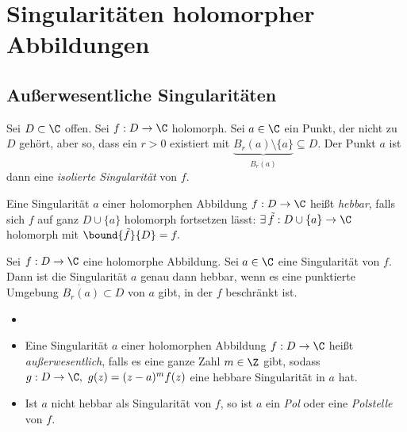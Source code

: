 \chapter[Singularitäten]{Singularitäten holomorpher Abbildungen}\lecture
	
	\section{Außerwesentliche Singularitäten}
		
		\begin{defn}
			Sei $ D \subset \C $ offen. Sei $ f: D \to \C $ holomorph. Sei $ a \in \C $ ein Punkt, der nicht zu $D$ gehört, aber so, dass ein $r>0$ existiert mit $ \underbrace{B_r(a) \setminus \{a\}}_{\dot{B_r(a)}} \subseteq D $. Der Punkt $a$ ist dann eine \emph{isolierte Singularität} von $f$.
		\end{defn}
		
		\begin{defn}
			Eine Singularität $a$ einer holomorphen Abbildung $f: D \to \C$ heißt \emph{hebbar}, falls sich $f$ auf ganz $D \cup \{a\}$ holomorph fortsetzen lässt: $ \exists\, \tilde{f}: D \cup \{a\} \to \C $ holomorph mit $ \bound{\tilde{f}}{D} = f. $
		\end{defn}
		
		\begin{thmn}
			Sei $ f: D \to \C $ eine holomorphe Abbildung. Sei $a \in \C$ eine Singularität von $f$. Dann ist die Singularität $a$ genau dann hebbar, wenn es eine punktierte Umgebung $ \dot{B_r(a)} \subset D $ von $a$ gibt, in der $f$ beschränkt ist.
		\end{thmn}
		
		\begin{defn}
			\begin{itemize}
				\item[]
				\item Eine Singularität $a$ einer holomorphen Abbildung $ f: D \to \C $ heißt \emph{außerwesentlich}, falls es eine ganze Zahl $m \in \Z$ gibt, sodass $ g: D \to \C,\ g(z) = (z-a)^mf(z) $ eine hebbare Singularität in $a$ hat.
				\item Ist $a$ nicht hebbar als Singularität von $f$, so ist $a$ ein \emph{Pol} oder eine \emph{Polstelle} von $f$.
			\end{itemize}
		\end{defn}
		
